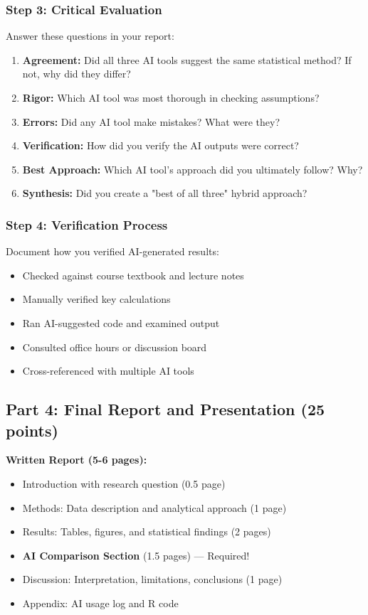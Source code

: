 \documentclass[11pt]{article}
\begin{document}
\subsubsection{Step 3: Critical Evaluation}

Answer these questions in your report:
\begin{enumerate}
\item \textbf{Agreement:} Did all three AI tools suggest the same statistical method? If not, why did they differ?
\item \textbf{Rigor:} Which AI tool was most thorough in checking assumptions?
\item \textbf{Errors:} Did any AI tool make mistakes? What were they?
\item \textbf{Verification:} How did you verify the AI outputs were correct?
\item \textbf{Best Approach:} Which AI tool's approach did you ultimately follow? Why?
\item \textbf{Synthesis:} Did you create a "best of all three" hybrid approach?
\end{enumerate}

\subsubsection{Step 4: Verification Process}

Document how you verified AI-generated results:
\begin{itemize}
\item Checked against course textbook and lecture notes
\item Manually verified key calculations
\item Ran AI-suggested code and examined output
\item Consulted office hours or discussion board
\item Cross-referenced with multiple AI tools
\end{itemize}

\subsection{Part 4: Final Report and Presentation (25 points)}

\textbf{Written Report (5-6 pages):}
\begin{itemize}
\item Introduction with research question (0.5 page)
\item Methods: Data description and analytical approach (1 page)
\item Results: Tables, figures, and statistical findings (2 pages)
\item \textbf{AI Comparison Section} (1.5 pages) --- \textcolor{aiblue}{Required!}
\item Discussion: Interpretation, limitations, conclusions (1 page)
\item Appendix: AI usage log and R code
\end{itemize}
\end{document}
